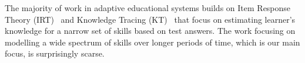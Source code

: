 \documentclass[letterpaper]{article} %
\begin{document}

The majority of work in adaptive educational systems builds on Item Response Theory (IRT)~\cite{Rasch1960,Pelanek2017} and Knowledge Tracing (KT)~\cite{yudelson2013individualized} that focus on estimating learner's knowledge for a narrow set of skills based on test answers. The work focusing on modelling a wide spectrum of skills over longer periods of time, which is our main focus, is surprisingly scarse.
\end{document}
